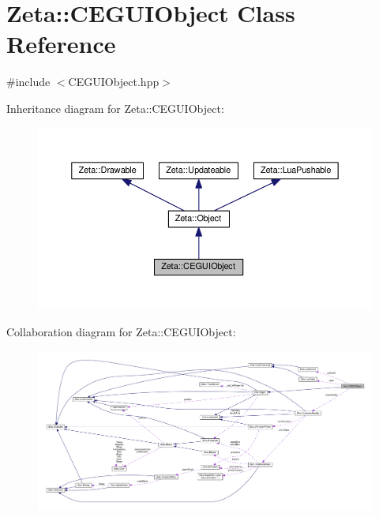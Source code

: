 \hypertarget{classZeta_1_1CEGUIObject}{\section{Zeta\+:\+:C\+E\+G\+U\+I\+Object Class Reference}
\label{classZeta_1_1CEGUIObject}
}


{\ttfamily \#include $<$C\+E\+G\+U\+I\+Object.\+hpp$>$}



Inheritance diagram for Zeta\+:\+:C\+E\+G\+U\+I\+Object\+:\nopagebreak
\begin{figure}[H]
\begin{center}
\leavevmode
\includegraphics[width=350pt]{classZeta_1_1CEGUIObject__inherit__graph}
\end{center}
\end{figure}


Collaboration diagram for Zeta\+:\+:C\+E\+G\+U\+I\+Object\+:
\nopagebreak
\begin{figure}[H]
\begin{center}
\leavevmode
\includegraphics[width=350pt]{classZeta_1_1CEGUIObject__coll__graph}
\end{center}
\end{figure}
